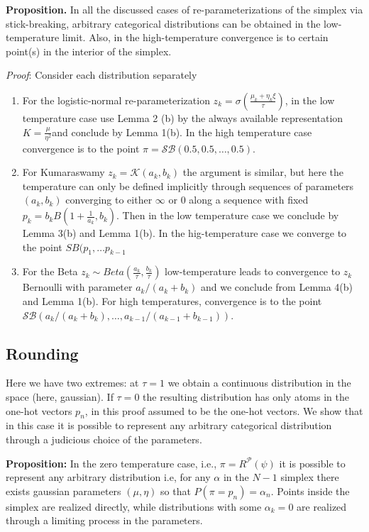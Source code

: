 \documentclass{article}
\begin{document}
\textbf{Proposition.} In all the discussed cases of re-parameterizations of the simplex via stick-breaking, arbitrary categorical distributions can be obtained in the low-temperature limit. Also, in the high-temperature convergence is to certain point(s) in the interior of the simplex.

\textit{Proof}: Consider each distribution separately
\begin{enumerate}
\item For the logistic-normal re-parameterization $z_k = \sigma\left( \frac{\mu_k+\eta_k\xi}{\tau}\right)$, in the low temperature case use Lemma 2 (b) by the always available representation  $K= \frac{\mu}{\eta^2}$and conclude by Lemma 1(b). In the high temperature case convergence is to the point $\pi = \mathcal{SB}(0.5,0.5,\ldots, 0.5)$.
\item For Kumaraswamy $z_k=\mathcal{K}(a_k,b_k)$ the argument is similar, but here the temperature can only be defined implicitly through sequences of parameters $(a_k,b_k)$ converging to either $\infty$ or 0 along a sequence with fixed $p_k=b_kB\left(1+\frac{1}{a_k},b_k\right)$. Then in the low temperature case we conclude by Lemma 3(b) and Lemma 1(b). In the hig-temperature case we converge to the point $SB(p_1,\ldots p_{k-1}$
\item For the Beta $z_k\sim Beta(\frac{a_k}{\tau},\frac{b_k}{\tau})$ low-temperature leads to convergence to $z_k$ Bernoulli with parameter $a_k/(a_k+b_k)$ and we conclude from Lemma 4(b) and Lemma 1(b). For high temperatures, convergence is to the point $\mathcal{SB}(a_k/(a_k+b_k),\ldots,a_{k-1}/(a_{k-1}+b_{k-1}))$.  \end{enumerate}


\subsection{Rounding}
Here we have two extremes: at $\tau =1$ we obtain a continuous distribution in the space (here, gaussian). If $\tau=0$ the resulting distribution has only atoms in the one-hot vectors $p_n$, in this proof assumed to be the one-hot vectors. We show that in this case it is possible to represent any arbitrary categorical distribution through a judicious choice of the parameters.


\textbf{Proposition:} In the zero temperature case, i.e., $\pi  = R^\mathcal{P}(\psi)$ it is possible to represent any arbitrary distribution i.e, for any $\alpha$ in the $N-1$ simplex there exists gaussian parameters $(\mu, \eta)$ so that   $P(\pi = p_n)  = \alpha_n$. Points inside the simplex are realized directly, while distributions with some $\alpha_k=0$ are realized through a limiting process in the parameters.
\end{document}

